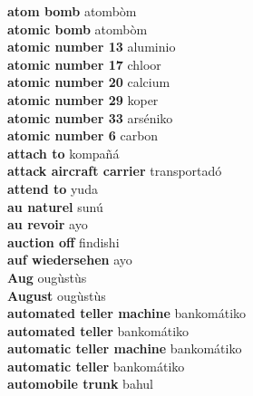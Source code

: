 \textbf{ atom bomb  } atombòm \\
\textbf{ atomic bomb  } atombòm \\
\textbf{ atomic number 13  } aluminio \\
\textbf{ atomic number 17  } chloor \\
\textbf{ atomic number 20  } calcium \\
\textbf{ atomic number 29  } koper \\
\textbf{ atomic number 33  } arséniko \\
\textbf{ atomic number 6  } carbon \\
\textbf{ attach to  } kompañá \\
\textbf{ attack aircraft carrier  } transportadó \\
\textbf{ attend to  } yuda \\
\textbf{ au naturel  } sunú \\
\textbf{ au revoir  } ayo \\
\textbf{ auction off  } findishi \\
\textbf{ auf wiedersehen  } ayo \\
\textbf{ Aug  } ougùstùs \\
\textbf{ August  } ougùstùs \\
\textbf{ automated teller machine  } bankomátiko \\
\textbf{ automated teller  } bankomátiko \\
\textbf{ automatic teller machine  } bankomátiko \\
\textbf{ automatic teller  } bankomátiko \\
\textbf{ automobile trunk  } bahul \\
